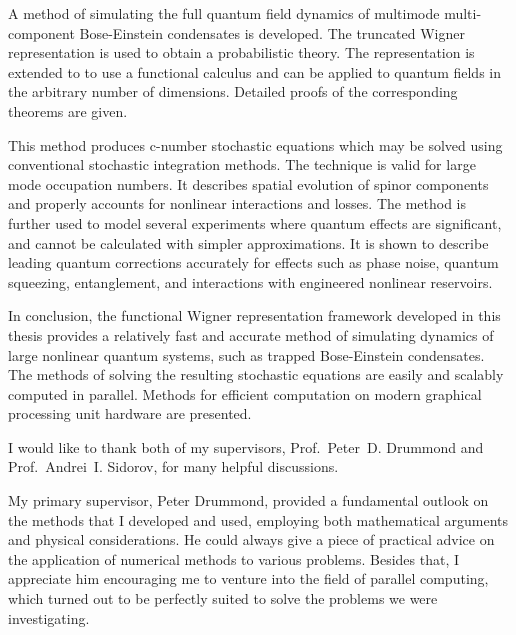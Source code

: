 

\cleardoublepage



A method of simulating the full quantum field dynamics of multimode multi-component Bose-Einstein condensates is developed.
The truncated Wigner representation is used to obtain a probabilistic theory.
The representation is extended to to use a functional calculus and can be applied to quantum fields in the arbitrary number of dimensions.
Detailed proofs of the corresponding theorems are given.

This method produces c-number stochastic equations which may be solved using conventional stochastic integration methods.
The technique is valid for large mode occupation numbers.
It describes spatial evolution of spinor components and properly accounts for nonlinear interactions and losses.
The method is further used to model several experiments where quantum effects are significant, and cannot be calculated with simpler approximations.
It is shown to describe leading quantum corrections accurately for effects such as phase noise, quantum squeezing, entanglement, and interactions with engineered nonlinear reservoirs.

In conclusion, the functional Wigner representation framework developed in this thesis provides a relatively fast and accurate method of simulating dynamics of large nonlinear quantum systems, such as trapped Bose-Einstein condensates.
The methods of solving the resulting stochastic equations are easily and scalably computed in parallel.
Methods for efficient computation on modern graphical processing unit hardware are presented.


\cleardoublepage


I would like to thank both of my supervisors, Prof.~Peter~D. Drummond and Prof.~Andrei~I. Sidorov, for many helpful discussions.

My primary supervisor, Peter Drummond, provided a fundamental outlook on the methods that I developed and used, employing both mathematical arguments and physical considerations.
He could always give a piece of practical advice on the application of numerical methods to various problems.
Besides that, I appreciate him encouraging me to venture into the field of parallel computing, which turned out to be perfectly suited to solve the problems we were investigating.

